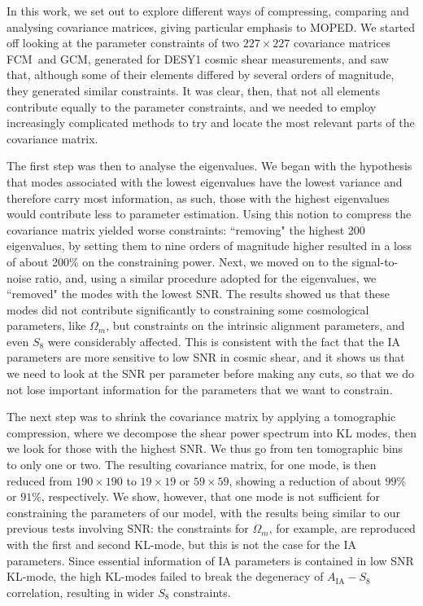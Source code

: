 \documentclass[twocolumn]{\docclass}
\newcommand\full{FCM}
\newcommand\gaussian{GCM}
\begin{document}
	In this work, we set out to explore different ways of compressing, comparing and analysing covariance matrices, giving particular emphasis to MOPED. We started off looking at the parameter constraints of two $227 \times 227$ covariance matrices \full\ and \gaussian, generated for DESY1 cosmic shear measurements, and saw that, although some of their elements differed by several orders of magnitude, they generated similar constraints. It was clear, then, that not all elements contribute equally to the parameter constraints, and we needed to employ increasingly complicated methods to try and locate the most relevant parts of the covariance matrix.
	
	The first step was then to analyse the eigenvalues. We began with the hypothesis that modes associated with the lowest eigenvalues have the lowest variance and therefore carry most information, as such, those with the highest eigenvalues would contribute less to parameter estimation. Using this notion to compress the covariance matrix yielded worse constraints: ``removing" the highest 200 eigenvalues, by setting them to nine orders of magnitude higher resulted in a loss of about 200\% on the constraining power. Next, we moved on to the signal-to-noise ratio, and, using a similar procedure adopted for the eigenvalues, we ``removed" the modes with the lowest SNR. The results showed us that these modes did not contribute significantly to constraining some cosmological parameters, like $\Omega_m$, but constraints on the intrinsic alignment parameters, and even $S_8$ were considerably affected. This is consistent with the fact that the IA parameters are more sensitive to low SNR in cosmic shear, and it shows us that we need to look at the SNR per parameter before making any cuts, so that we do not lose important information for the parameters that we want to constrain.
	
	The next step was to shrink the covariance matrix by applying a tomographic compression, where we decompose the shear power spectrum into KL modes, then we look for those with the highest SNR. We thus go from ten tomographic bins to only one or two. The resulting covariance matrix, for one mode, is then reduced from $190 \times 190$ to $19 \times 19$ or $59 \times 59$, showing a reduction of about $99\%$ or $91\%$, respectively. We show, however, that one mode is not sufficient for constraining the parameters of our model, with the results being similar to our previous tests involving SNR: the constraints for $\Omega_m$, for example, are reproduced with the first and second KL-mode, but this is not the case for the IA parameters. Since essential information of IA parameters is contained in low SNR KL-mode, the high KL-modes failed to break the degeneracy of $A_{\mathrm{IA}}-S_8$ correlation, resulting in wider $S_8$ constraints. 
	
\end{document}
